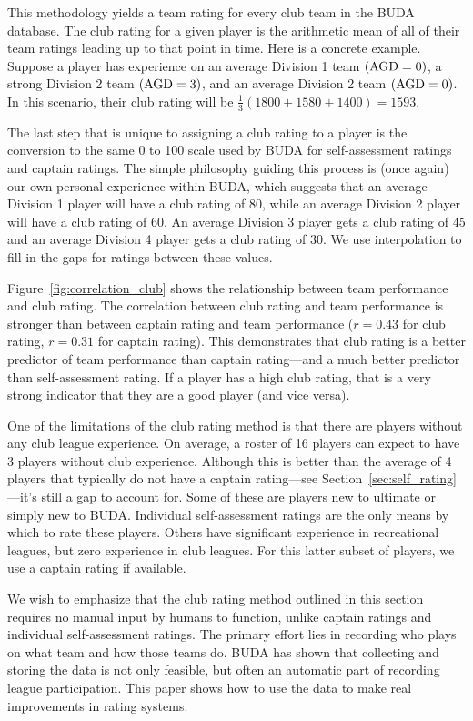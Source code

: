 This methodology yields a team rating for every club team in the BUDA database. The club rating for a given player is the arithmetic mean of all of their team ratings leading up to that point in time. Here is a concrete example. Suppose a player has experience on an average Division 1 team $({\rm AGD} = 0)$, a strong Division 2 team $({\rm AGD} = 3)$, and an average Division 2 team $({\rm AGD} = 0)$. In this scenario, their club rating will be $\frac{1}{3}(1800 + 1580 + 1400) = 1593$.

The last step that is unique to assigning a club rating to a player is the conversion to the same 0 to 100 scale used by BUDA for self-assessment ratings and captain ratings. The simple philosophy guiding this process is (once again) our own personal experience within BUDA, which suggests that an average Division 1 player will have a club rating of 80, while an average Division 2 player will have a club rating of 60. An average Division 3 player gets a club rating of 45 and an average Division 4 player gets a club rating of 30. We use interpolation to fill in the gaps for ratings between these values.

Figure~\ref{fig:correlation_club} shows the relationship between team performance and club rating. The correlation between club rating and team performance is stronger than between captain rating and team performance ($r = 0.43$ for club rating, $r = 0.31$ for captain rating). This demonstrates that club rating is a better predictor of team performance than captain rating---and a much better predictor than self-assessment rating. If a player has a high club rating, that is a very strong indicator that they are a good player (and vice versa).

One of the limitations of the club rating method is that there are players without any club league experience.  On average, a roster of 16 players can expect to have 3 players without club experience. Although this is better than the average of 4 players that typically do not have a captain rating---see Section~\ref{sec:self_rating}---it's still a gap to account for. Some of these are players new to ultimate or simply new to BUDA. Individual self-assessment ratings are the only means by which to rate these players. Others have significant experience in recreational leagues, but zero experience in club leagues. For this latter subset of players, we use a captain rating if available. 

We wish to emphasize that the club rating method outlined in this section requires no manual input by humans to function, unlike captain ratings and individual self-assessment ratings. The primary effort lies in recording who plays on what team and how those teams do. BUDA has shown that collecting and storing the data is not only feasible, but often an automatic part of recording league participation. This paper shows how to use the data to make real improvements in rating systems.


